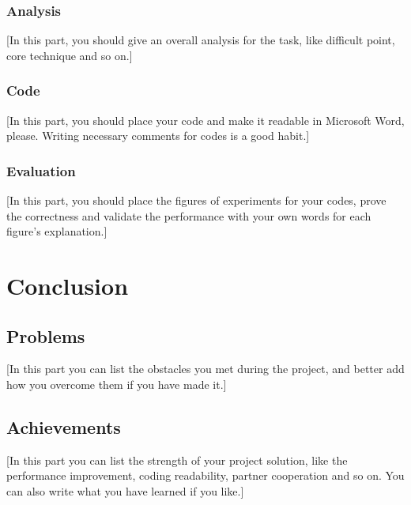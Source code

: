 \documentclass{article}
\begin{document}
\subsubsection{Analysis}

[In this part, you should give an overall analysis for the task, like difficult point, core technique and so on.]

\subsubsection{Code}

[In this part, you should place your code and make it readable in Microsoft Word, please. Writing necessary comments for codes is a good habit.]

\subsubsection{Evaluation}

[In this part, you should place the figures of experiments for your codes, prove the correctness and validate the performance with your own words for each figure’s explanation.]

\section{Conclusion}

\subsection{Problems}

[In this part you can list the obstacles you met during the project, and better add how you overcome them if you have made it.]

\subsection{Achievements}

[In this part you can list the strength of your project solution, like the performance improvement, coding readability, partner cooperation and so on. You can also write what you have learned if you like.]



\end{document}
